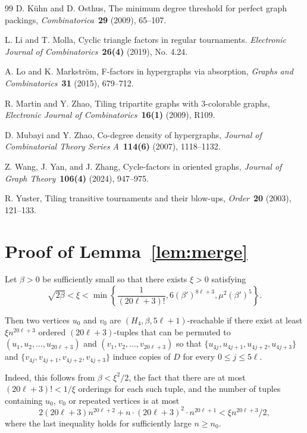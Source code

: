 \documentclass[11pt]{amsart}
\begin{document}
\begin{thebibliography}{99}
 D. K\"{u}hn and D. Osthus, The minimum degree threshold for perfect
graph packings, \emph{Combinatorica}~{\bf 29} (2009), 65--107.

 L. Li and T. Molla, Cyclic triangle factors in regular tournaments. \emph{Electronic Journal of Combinatorics}~{\bf 26(4)} (2019), No. 4.24.

  A. Lo and K. Markstr\"om, F-factors in hypergraphs via absorption, \emph{Graphs and Combinatorics}~{\bf 31} (2015), 679--712.

 R. Martin and Y. Zhao, Tiling tripartite graphs with 3-colorable graphs, \emph{Electronic Journal of Combinatorics}~{\bf 16(1)} (2009), R109. 

 D. Mubayi and Y. Zhao, Co-degree density of hypergraphs, \emph{Journal of Combinatorial Theory Series A}~{\bf 114(6)} (2007), 1118--1132. 

 Z. Wang, J. Yan, and J. Zhang, Cycle-factors in oriented graphs, \emph{Journal of Graph Theory}~{\bf 106(4)} (2024), 947--975. 

 R. Yuster, Tiling transitive tournaments and their blow-ups, \emph{Order}~{\bf 20} (2003), 121--133.

\end{thebibliography}

\appendix
\section{Proof of Lemma~\ref{lem:merge}} \label{appendix}

Let $\beta>0$ be sufficiently small so that there exists $\xi>0$ satisfying 
$$ \sqrt{2 \beta} < \xi < \min \left\{ \frac{1}{(20\ell+3)!},  6 (\beta')^{8\ell+3} , \mu^2 (\beta')^{5} \right\} .$$

Then two vertices $u_0$ and $v_0$ are $(H_4,\beta,5\ell+1)$-reachable if there exist at least $ \xi n^{20\ell+3}$ ordered $(20\ell+3)$-tuples that can be permuted to $(u_1, u_2, \dots, u_{20\ell+3})$ and $(v_1, v_2, \dots, v_{20\ell+3})$ so that $\{u_{4j},u_{4j+1},u_{4j+2},u_{4j+3}\}$ and $\{v_{4j},v_{4j+1},v_{4j+2}, v_{4j+3}\}$ induce copies of $D$ for every $0\le j \le 5\ell$.

Indeed, this follows from $\beta< \xi^2/2$, the fact that there are at most $(20\ell+3)!<1/\xi$ orderings for each such tuple, and the number of tuples containing $u_0$, $v_0$ or repeated vertices is at most 
$$ 2(20\ell+3)n^{20\ell+2} + n \cdot (20\ell+3)^2 \cdot n^{20\ell+1} < \xi n^{20\ell+3}/2 ,$$
where the last inequality holds for sufficiently large $n\ge n_0$.
\end{document}

